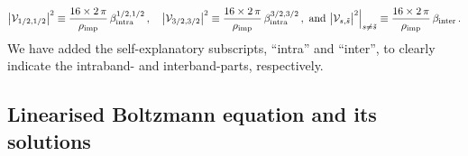 \documentclass[aps,prb,onecolumn,nofootinbib,citeautoscript,10pt, showkeys]{revtex4-2}
\begin{document}
\begin{align}
\big | {\mathcal V}_{1/2,1/2} \big |^2  
   \equiv  \frac{ 16\times 2\,\pi} {\rho_{\rm imp}} \, \beta_{\rm intra}^{1/2,1/2} \,,\quad
\big | {\mathcal V}_{3/2,3/2} \big |^2  
   \equiv  \frac{ 16\times 2\,\pi} {\rho_{\rm imp}} \, \beta_{\rm intra}^{3/2,3/2} \,,   
 \text{ and } 
 \big | {\mathcal V}_{ s,{\tilde s} } \big |^2 \Big \vert_{ s \neq \tilde s} 
 \equiv \frac{ 16\times 2\,\pi} {\rho_{\rm imp}}\, \beta_{\rm inter} \,.
\end{align} 
We have added the self-explanatory subscripts, ``intra'' and ``inter'', to clearly indicate the intraband- and interband-parts, respectively.



\subsection{Linearised Boltzmann equation and its solutions}
\end{document}
